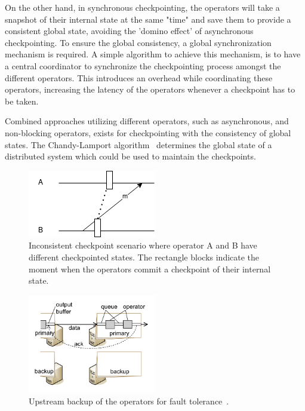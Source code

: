 On the other hand, in synchronous checkpointing, the operators will take a snapshot 
of their internal state at the same "time" and save them to provide a consistent 
global state, avoiding the 'domino effect' of asynchronous checkpointing. To ensure 
the global consistency, a global synchronization mechanism is required. A simple 
algorithm to achieve this mechanism, is to have a central coordinator to synchronize 
the checkpointing process amongst the different operators. This introduces an overhead 
while coordinating these operators, increasing the latency of the operators whenever a 
checkpoint has to be taken. 


Combined approaches utilizing different operators, such as asynchronous, and non-blocking
operators, exists for checkpointing with the consistency of global states. 
The Chandy-Lamport algorithm~\cite{chandy_lamport} determines the 
global state of a distributed system which could be used to maintain the checkpoints. 

\begin{figure}[!htbp]
    \centering
    \includegraphics{fig/checkpoint_inconsistency.png}
    \caption{Inconsistent checkpoint scenario where operator A and B have different
    checkpointed states. The rectangle blocks indicate the moment when the operators 
    commit a checkpoint of their internal state. }
    \label{fig:checkpoint_inconsistency}
\end{figure}


\begin{figure}[!htbp]
    \centering
    \includegraphics[width=0.5\textwidth]{fig/upstream.png}
    \caption{Upstream backup of the operators for fault tolerance~\cite{upstream_backup}.}
    \label{fig:upstream}
    
\end{figure}

